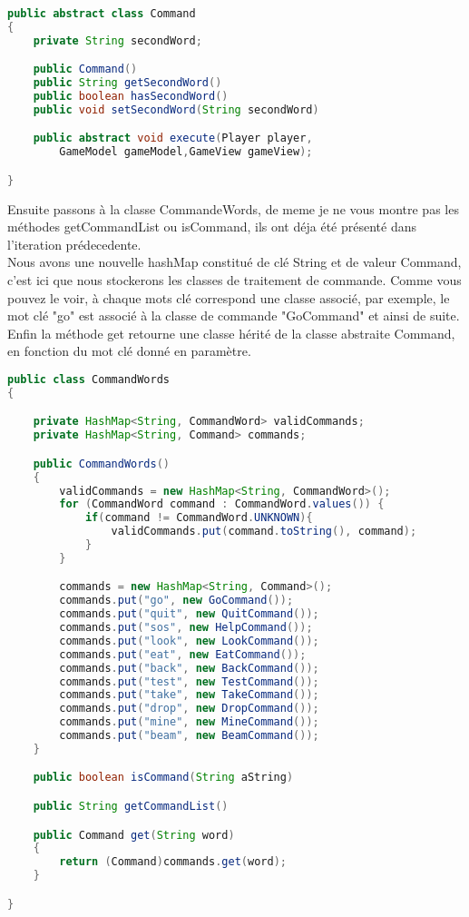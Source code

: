 \documentclass[a4paper , 10pt]{article}
\begin{document}
\begin{lstlisting}[language=Java]
    
public abstract class Command
{
    private String secondWord;

    public Command()
    public String getSecondWord()
    public boolean hasSecondWord()
    public void setSecondWord(String secondWord)

    public abstract void execute(Player player, 
        GameModel gameModel,GameView gameView);

}
\end{lstlisting}

Ensuite passons à la classe CommandeWords, de meme je ne vous montre pas les méthodes getCommandList ou isCommand, ils ont déja été présenté dans l'iteration prédecedente.\\
Nous avons une nouvelle hashMap constitué de clé String et de valeur Command, c'est ici que nous stockerons les classes de traitement de commande.
Comme vous pouvez le voir, à chaque mots clé correspond une classe associé, par exemple, le mot clé "go" est associé à la classe de commande "GoCommand" et ainsi de suite.\\
Enfin la méthode get retourne une classe hérité de la classe abstraite Command, en fonction du mot clé donné en paramètre.

\begin{lstlisting}[language=Java, caption={CommandeWords}]
public class CommandWords
{

    private HashMap<String, CommandWord> validCommands;
    private HashMap<String, Command> commands;

    public CommandWords()
    {
        validCommands = new HashMap<String, CommandWord>();
        for (CommandWord command : CommandWord.values()) {
            if(command != CommandWord.UNKNOWN){
                validCommands.put(command.toString(), command);
            }
        }

        commands = new HashMap<String, Command>();
        commands.put("go", new GoCommand());
        commands.put("quit", new QuitCommand());
        commands.put("sos", new HelpCommand());
        commands.put("look", new LookCommand());
        commands.put("eat", new EatCommand());
        commands.put("back", new BackCommand());
        commands.put("test", new TestCommand());
        commands.put("take", new TakeCommand());
        commands.put("drop", new DropCommand());
        commands.put("mine", new MineCommand());
        commands.put("beam", new BeamCommand());
    }

    public boolean isCommand(String aString)

    public String getCommandList()

    public Command get(String word)
    {
        return (Command)commands.get(word);
    }

}
\end{lstlisting}
\end{document}
